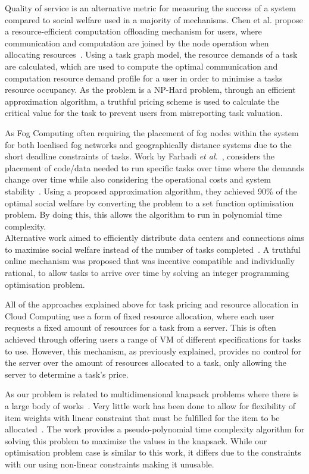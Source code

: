 Quality of service is an alternative metric for measuring the success of a system compared to social welfare used in a
majority of mechanisms. Chen et al. propose a resource-efficient computation offloading mechanism for users, where
communication and computation are joined by the node operation when allocating resources~\cite{8379445}. Using a task
graph model, the resource demands of a task are calculated, which are used to compute the optimal communication and
computation resource demand profile for a user in order to minimise a tasks resource occupancy. As the problem is a
NP-Hard problem, through an efficient approximation algorithm, a truthful pricing scheme is used to calculate the
critical value for the task to prevent users from misreporting task valuation.

As Fog Computing often requiring the placement of fog nodes within the system for both localised fog networks and
geographically distance systems due to the short deadline constraints of tasks. Work by Farhadi \emph{et al.}~\cite{vaji_infocom}, considers
the placement of code/data needed to run specific tasks over time where the demands change over time while also
considering the operational costs and system stability~\cite{vaji_infocom}. Using a proposed approximation algorithm,
they achieved 90\% of the optimal social welfare by converting the problem to a set function optimisation problem. By
doing this, this allows the algorithm to run in polynomial time complexity. \\
Alternative work aimed to efficiently distribute data centers and connections aims to maximise social
welfare instead of the number of tasks completed~\cite{Bi2019}. A truthful online mechanism was proposed that was
incentive compatible and individually rational, to allow tasks to arrive over time by solving an integer programming
optimisation problem.

All of the approaches explained above for task pricing and resource allocation in Cloud Computing use a form of fixed
resource allocation, where each user requests a fixed amount of resources for a task from a server. This is often
achieved through offering users a range of VM of different specifications for tasks to use. However, this mechanism,
as previously explained, provides no control for the server over the amount of resources allocated to a task, only
allowing the server to determine a task's price.

As our problem is related to multidimensional knapsack problems where there is a large body of
works~\cite{knapsacks, numbers}. Very little work has been done to allow for flexibility of item weights with linear
constraint that must be fulfilled for the item to be allocated~\cite{Nip2017}. The work provides a pseudo-polynomial
time complexity algorithm for solving this problem to maximize the values in the knapsack. While our optimisation
problem case is similar to this work, it differs due to the constraints with our using non-linear constraints making
it unusable.
